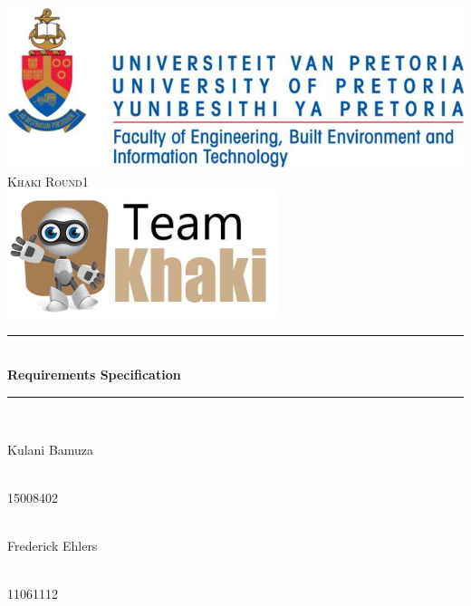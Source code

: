 \begin{titlepage}
	
	\begin{center}
		\includegraphics[width=0.7\linewidth]{Images/uniLogo.jpg}\\[1cm]    
		\textsc{\LARGE Khaki Round1}\\[0.3cm]
		\includegraphics[width=0.5\linewidth]{Images/TeamLogoSmall.jpg}\\[0.5cm]
		\rule{\linewidth}{0.5mm} \\[1cm]
		{ \huge \bfseries Requirements Specification}\\[0.5cm]
		\rule{\linewidth}{0.5mm} \\[1cm] 			
		
		\begin{minipage}{0.4\textwidth}
			\begin{flushleft} \large
				Kulani {Bamuza}
			\end{flushleft}
		\end{minipage}
		\begin{minipage}{0.4\textwidth}
			\begin{flushright} \large
				\emph{} \\
				15008402 
			\end{flushright}
		\end{minipage}
		
		
		\begin{minipage}{0.4\textwidth}
			\begin{flushleft} \large
				\emph{} \\
				Frederick {Ehlers}
			\end{flushleft}
		\end{minipage}
		\begin{minipage}{0.4\textwidth}
			\begin{flushright} \large
				\emph{} \\
				11061112
			\end{flushright}
		\end{minipage}
		

\end{center}
\end{titlepage}
